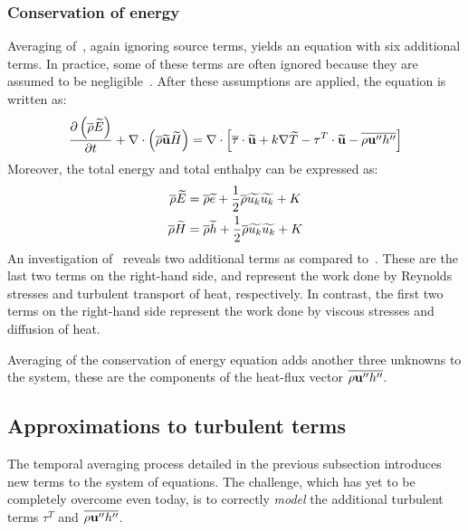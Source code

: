 \subsubsection{Conservation of energy}
%
Averaging of~, again ignoring source terms, yields an equation with six additional terms. In practice, some of these terms are often ignored because they are assumed to be negligible~\cite{blazek2015computational}. After these assumptions are applied, the equation is written as:
\begin{align}
     \frac{\partial \left(\overline{\rho}\widetilde{E}\right)}{\partial t} 
    + \nabla\cdot\left(\overline{\rho} \widetilde{\mathbf{u}} \widetilde{H}\right)
    =
    \nabla\cdot\left[
        \overline{\tau}\cdot\widetilde{\mathbf{u}}
        + k\nabla\widetilde{T}
         -\tau^T\cdot\widetilde{\mathbf{u}}
         - \overline{\rho \mathbf{u}'' h''}
    \right]
    \label{eq:renergy}
\end{align}
Moreover, the total energy and total enthalpy can be expressed as:
\begin{align*}
    \overline{\rho}\widetilde{E} &= \overline{\rho}\widetilde{e}
        + \frac{1}{2}\overline{\rho}\widetilde{u_k}\widetilde{u_k} + K\\
    \overline{\rho}\widetilde{H} &= \overline{\rho}\widetilde{h}
        + \frac{1}{2}\overline{\rho}\widetilde{u_k}\widetilde{u_k} + K
\end{align*}
%
An investigation of~ reveals two additional terms as compared to~. These are the last two terms on the right-hand side, and represent the work done by Reynolds stresses and turbulent transport of heat, respectively. In contrast, the first two terms on the right-hand side represent the work done by viscous stresses and diffusion of heat.

Averaging of the conservation of energy equation adds another three unknowns to the system, these are the components of the heat-flux vector $\overline{\rho \mathbf{u}'' h''}$.
%
\subsection{Approximations to turbulent terms}
%
\label{sec:bouss}
The temporal averaging process detailed in the previous subsection introduces new terms to the system of equations. The challenge, which
has yet to be completely overcome even today, is to correctly
\textit{model} the additional turbulent terms $\tau^T$ and
$\overline{\rho \mathbf{u}'' h''}$.

